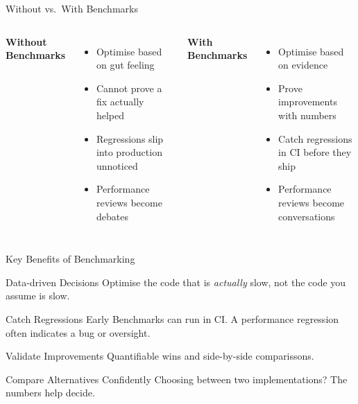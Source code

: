 \documentclass[aspectratio=1610, xcolor=table]{beamer}
\begin{document}
\begin{frame}{Without vs.\ With Benchmarks}
	\begin{columns}[T]
		\textbf{Without Benchmarks}
		\begin{itemize}
			\item Optimise based on gut feeling
			\item Cannot prove a fix actually helped
			\item Regressions slip into production unnoticed
			\item Performance reviews become debates
		\end{itemize}

		\textbf{With Benchmarks}
		\begin{itemize}
			\item Optimise based on evidence
			\item Prove improvements with numbers
			\item Catch regressions in CI before they ship
			\item Performance reviews become conversations
		\end{itemize}
	\end{columns}
\end{frame}

\begin{frame}{Key Benefits of Benchmarking}
	\begin{block}{Data-driven Decisions}
		Optimise the code that is \textit{actually} slow, not the code you assume is slow.
	\end{block}

	\vspace{0.6em}

	\begin{block}{Catch Regressions Early}
		Benchmarks can run in CI. A performance regression often indicates a bug or oversight.
	\end{block}

	\vspace{0.6em}

	\begin{block}{Validate Improvements}
		Quantifiable wins and side-by-side comparissons.
	\end{block}

	\vspace{0.6em}

	\begin{block}{Compare Alternatives Confidently}
		Choosing between two implementations? The numbers help decide.
	\end{block}
\end{frame}
\end{document}
